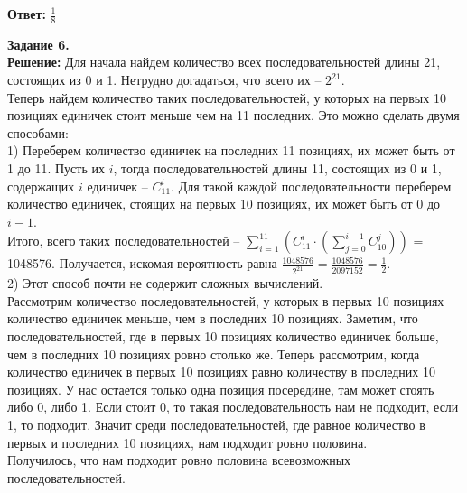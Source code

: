 \documentclass[12pt,a4paper]{scrartcl}
\begin{document}
	\begin{flushright}
		\textbf{Ответ:} $\frac{1}{8}$
	\end{flushright}
	\textbf{Задание 6.} 
	\\
	\textbf{Решение:} Для начала найдем количество всех последовательностей длины 21, состоящих из 0 и 1. Нетрудно догадаться, что всего их -- $2^{21}$. \\
	Теперь найдем количество таких последовательностей, у которых на первых 10 позициях единичек стоит меньше чем на 11 последних. Это можно сделать двумя способами: \\
	1) Переберем количество единичек на последних 11 позициях, их может быть от 1 до 11. Пусть их $i$, тогда последовательностей длины 11, состоящих из 0 и 1, содержащих $i$ единичек -- $C_{11}^{i}$. Для такой каждой последовательности переберем количество единичек, стоящих на первых 10 позициях, их может быть от 0 до $i-1$. \\
	Итого, всего таких последовательностей -- $\sum\limits_{i=1}^{11}(C_{11}^{i} \cdot (\sum\limits_{j=0}^{i-1} C_{10}^{j}))$ = 1048576.
	Получается, искомая вероятность равна $\frac{1048576}{2^{21}} = \frac{1048576}{2097152} = \frac{1}{2}$. \\
	2) Этот способ почти не содержит сложных вычислений.\\
	Рассмотрим количество последовательностей, у которых в первых 10 позициях количество единичек меньше, чем в последних 10 позициях.
	Заметим, что последовательностей, где в первых 10 позициях количество единичек больше, чем в последних 10 позициях ровно столько же. Теперь рассмотрим, когда количество единичек в первых 10 позициях равно количеству в последних 10 позициях. У нас остается только одна позиция посередине, там может стоять либо 0, либо 1. Если стоит 0, то такая последовательность нам не подходит, если 1, то подходит. Значит среди последовательностей, где равное количество в первых и последних 10 позициях, нам подходит ровно половина.\\
	Получилось, что нам подходит ровно половина всевозможных последовательностей.
	
\end{document}
